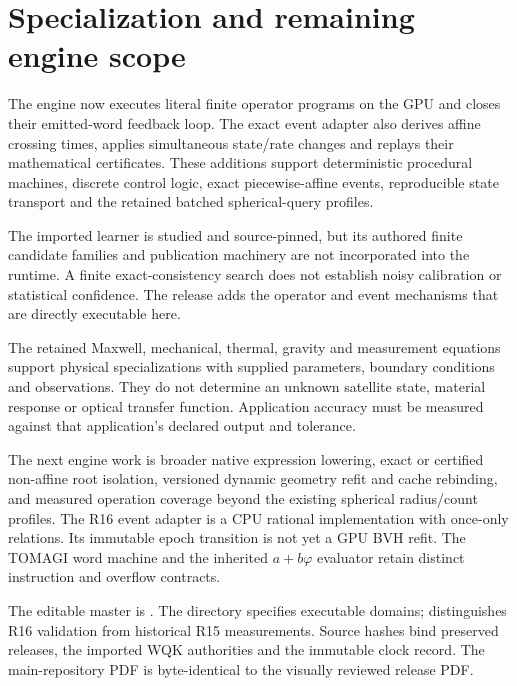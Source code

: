 \section{Specialization and remaining engine scope}
The engine now executes literal finite operator programs on the GPU and
closes their emitted-word feedback loop. The exact event adapter also derives
affine crossing times, applies simultaneous state/rate changes and replays
their mathematical certificates. These additions support deterministic
procedural machines, discrete control logic, exact piecewise-affine events,
reproducible state transport and the retained batched spherical-query profiles.

The imported learner is studied and source-pinned, but its authored finite
candidate families and publication machinery are not incorporated into the
runtime. A finite exact-consistency search does not establish noisy calibration
or statistical confidence. The release adds the operator and event mechanisms
that are directly executable here.

The retained Maxwell, mechanical, thermal, gravity and measurement equations
support physical specializations with supplied parameters, boundary conditions
and observations. They do not determine an unknown satellite state, material
response or optical transfer function. Application accuracy must be measured
against that application's declared output and tolerance.

The next engine work is broader native expression lowering, exact or certified
non-affine root isolation, versioned dynamic geometry refit and cache rebinding,
and measured operation coverage beyond the existing spherical radius/count
profiles. The R16 event adapter is a CPU rational implementation with once-only
relations. Its immutable epoch transition is not yet a GPU BVH refit. The
TOMAGI word machine and the inherited $a+b\varphi$ evaluator retain distinct
instruction and overflow contracts.

The editable master is . The  directory
specifies executable domains;  distinguishes R16 validation from
historical R15 measurements. Source hashes bind preserved releases, the imported
WQK authorities and the immutable clock record. The main-repository PDF is
byte-identical to the visually reviewed release PDF.
